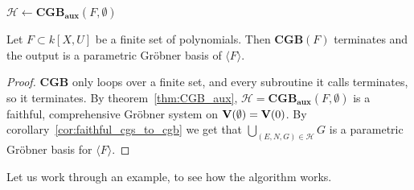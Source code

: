 \begin{algorithm}
  \caption{$\mathbf{CGB}$}
  $\mathcal H \gets \mathbf{CGB_{aux}}(F, \emptyset)$\;
  \;
\end{algorithm}
\begin{theorem}
  Let $F \subset k[X, U]$ be a finite set of polynomials. Then $\mathbf{CGB}(F)$ terminates and the output is a parametric Gröbner basis of $\langle F \rangle$.
\end{theorem}
\begin{proof}
  $\mathbf{CGB}$ only loops over a finite set, and every subroutine it calls terminates, so it terminates. By theorem~\ref{thm:CGB_aux}, $\mathcal H = \mathbf{CGB_{aux}}(F, \emptyset)$ is a faithful, comprehensive Gröbner system on $\operatorname{\mathbf V}(\emptyset) = \operatorname{\mathbf V}(0)$. By corollary~\ref{cor:faithful_cgs_to_cgb} we get that $\bigcup_{(E, N, G) \in \mathcal H} G$ is a parametric Gröbner basis for $\langle F \rangle$.
\end{proof}

Let us work through an example, to see how the algorithm works.

